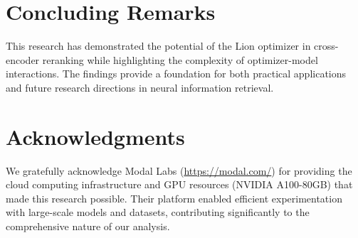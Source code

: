 \section{Concluding Remarks}

This research has demonstrated the potential of the Lion optimizer in cross-encoder reranking while highlighting the complexity of optimizer-model interactions. The findings provide a foundation for both practical applications and future research directions in neural information retrieval.

\section*{Acknowledgments}

We gratefully acknowledge Modal Labs (\url{https://modal.com/}) for providing the cloud computing infrastructure and GPU resources (NVIDIA A100-80GB) that made this research possible. Their platform enabled efficient experimentation with large-scale models and datasets, contributing significantly to the comprehensive nature of our analysis.